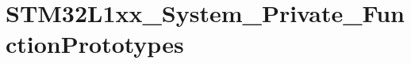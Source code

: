 \hypertarget{group___s_t_m32_l1xx___system___private___function_prototypes}{\section{S\-T\-M32\-L1xx\-\_\-\-System\-\_\-\-Private\-\_\-\-Function\-Prototypes}
\label{group___s_t_m32_l1xx___system___private___function_prototypes}
}

